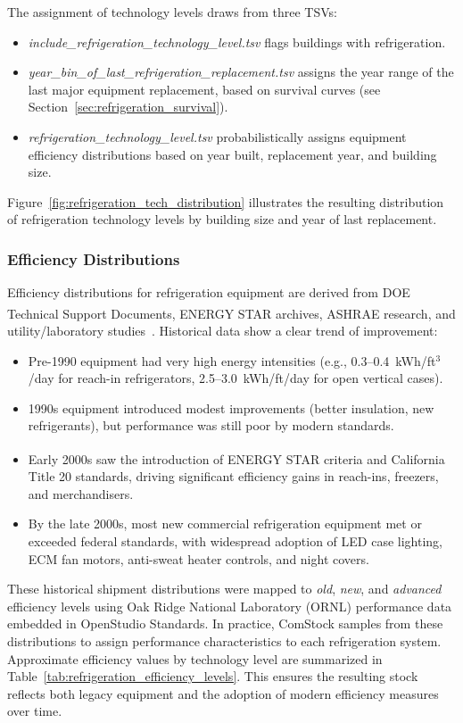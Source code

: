 The assignment of technology levels draws from three TSVs:
\begin{itemize}
    \item \textit{include\_refrigeration\_technology\_level.tsv} flags buildings with refrigeration.
    \item \textit{year\_bin\_of\_last\_refrigeration\_replacement.tsv} assigns the year range of the last major equipment replacement, based on survival curves (see Section~\ref{sec:refrigeration_survival}).
    \item \textit{refrigeration\_technology\_level.tsv} probabilistically assigns equipment efficiency distributions based on year built, replacement year, and building size.
\end{itemize}


Figure~\ref{fig:refrigeration_tech_distribution} illustrates the resulting distribution of refrigeration technology levels by building size and year of last replacement.

\subsubsection{Efficiency Distributions}
Efficiency distributions for refrigeration equipment are derived from DOE Technical Support Documents, ENERGY STAR\textsuperscript{\textregistered} archives, ASHRAE research, and utility/laboratory studies~\citep{DOE_TSD_2009,Fricke2010,CEC_Title20}. Historical data show a clear trend of improvement:
\begin{itemize}
    \item Pre-1990 equipment had very high energy intensities (e.g., 0.3--0.4~kWh/ft$^3$/day for reach-in refrigerators, 2.5--3.0~kWh/ft/day for open vertical cases).
    \item 1990s equipment introduced modest improvements (better insulation, new refrigerants), but performance was still poor by modern standards.
    \item Early 2000s saw the introduction of ENERGY STAR\textsuperscript{\textregistered} criteria and California Title 20 standards, driving significant efficiency gains in reach-ins, freezers, and merchandisers.
    \item By the late 2000s, most new commercial refrigeration equipment met or exceeded federal standards, with widespread adoption of LED case lighting, ECM fan motors, anti-sweat heater controls, and night covers.
\end{itemize}

These historical shipment distributions were mapped to \textit{old}, \textit{new}, and \textit{advanced} efficiency levels using Oak Ridge National Laboratory (ORNL) performance data embedded in OpenStudio Standards. In practice, ComStock samples from these distributions to assign performance characteristics to each refrigeration system. Approximate efficiency values by technology level are summarized in Table~\ref{tab:refrigeration_efficiency_levels}. This ensures the resulting stock reflects both legacy equipment and the adoption of modern efficiency measures over time.

